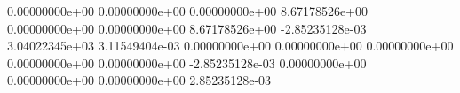  0.00000000e+00
 0.00000000e+00
 0.00000000e+00
 8.67178526e+00
 0.00000000e+00
 0.00000000e+00
 8.67178526e+00
 -2.85235128e-03
 3.04022345e+03
 3.11549404e-03
 0.00000000e+00
 0.00000000e+00
 0.00000000e+00
 0.00000000e+00
 0.00000000e+00
 -2.85235128e-03
 0.00000000e+00
 0.00000000e+00
 0.00000000e+00
 2.85235128e-03
